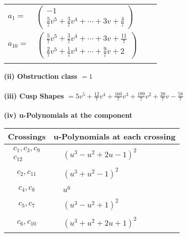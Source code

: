 \documentclass[1p]{elsarticle_modified}
\theoremstyle{definition}
\begin{document}
\begin{tabular}{m{7pt} m{180pt} m{7pt} m{180pt} }
\flushright $a_{1}=$&$\begin{pmatrix}-1\\\frac{5}{7} v^5+\frac{3}{7} v^4+\cdots+3 v+\frac{4}{7}\end{pmatrix}$ \\
\flushright $a_{10}=$&$\begin{pmatrix}\frac{5}{7} v^5+\frac{3}{7} v^4+\cdots+3 v+\frac{11}{7}\\\frac{2}{7} v^5+\frac{1}{7} v^4+\cdots+\frac{9}{7} v+2\end{pmatrix}$\\&\end{tabular}
\flushleft \textbf{(ii) Obstruction class $= 1$}\\~\\
\flushleft \textbf{(iii) Cusp Shapes $= 5 v^5+\frac{12}{7} v^4+\frac{160}{7} v^3+\frac{199}{7} v^2+\frac{20}{7} v-\frac{58}{7}$}\\~\\
\newpage\renewcommand{\arraystretch}{1}
\flushleft \textbf{(iv) u-Polynomials at the component}\newline \\
\begin{tabular}{m{50pt}|m{274pt}}
Crossings & \hspace{64pt}u-Polynomials at each crossing \\
\hline $$\begin{aligned}c_{1},c_{3},c_{9}\\c_{12}\end{aligned}$$&$\begin{aligned}
&(u^3- u^2+2 u-1)^2
\end{aligned}$\\
\hline $$\begin{aligned}c_{2},c_{11}\end{aligned}$$&$\begin{aligned}
&(u^3+u^2-1)^2
\end{aligned}$\\
\hline $$\begin{aligned}c_{4},c_{8}\end{aligned}$$&$\begin{aligned}
&u^6
\end{aligned}$\\
\hline $$\begin{aligned}c_{5},c_{7}\end{aligned}$$&$\begin{aligned}
&(u^3- u^2+1)^2
\end{aligned}$\\
\hline $$\begin{aligned}c_{6},c_{10}\end{aligned}$$&$\begin{aligned}
&(u^3+u^2+2 u+1)^2
\end{aligned}$\\
\hline
\end{tabular}\\~\\
\end{document}
